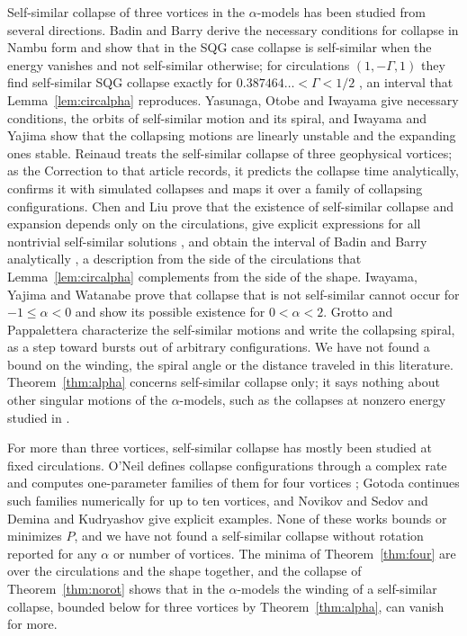 \documentclass[11pt]{article}
\theoremstyle{definition}
\begin{document}
Self-similar collapse of three vortices in the $\alpha$-models has been studied from several directions. Badin and Barry \cite{bb2018} derive the necessary conditions for collapse in Nambu form and show that in the SQG case collapse is self-similar when the energy vanishes and not self-similar otherwise; for circulations $(1, -\Gamma, 1)$ they find self-similar SQG collapse exactly for $0.387464\ldots < \Gamma < 1/2$ \cite[Lemma~1]{bb2018}, an interval that Lemma~\ref{lem:circalpha} reproduces. Yasunaga, Otobe and Iwayama \cite{yoi2021} give necessary conditions, the orbits of self-similar motion and its spiral, and Iwayama and Yajima \cite{iy2023} show that the collapsing motions are linearly unstable and the expanding ones stable. Reinaud \cite{reinaud2021} treats the self-similar collapse of three geophysical vortices; as the Correction to that article records, it predicts the collapse time analytically, confirms it with simulated collapses and maps it over a family of collapsing configurations. Chen and Liu \cite{cl2024} prove that the existence of self-similar collapse and expansion depends only on the circulations, give explicit expressions for all nontrivial self-similar solutions \cite[Theorems~2.1, 2.2]{cl2024}, and obtain the interval of Badin and Barry analytically \cite[Theorem~4.1]{cl2024}, a description from the side of the circulations that Lemma~\ref{lem:circalpha} complements from the side of the shape. Iwayama, Yajima and Watanabe \cite{iyw2025} prove that collapse that is not self-similar cannot occur for $-1 \le \alpha < 0$ and show its possible existence for $0 < \alpha < 2$. Grotto and Pappalettera \cite[Prop.~2.1]{gp2025} characterize the self-similar motions and write the collapsing spiral, as a step toward bursts out of arbitrary configurations. We have not found a bound on the winding, the spiral angle or the distance traveled in this literature. Theorem~\ref{thm:alpha} concerns self-similar collapse only; it says nothing about other singular motions of the $\alpha$-models, such as the collapses at nonzero energy studied in \cite{bb2018,iyw2025}.

For more than three vortices, self-similar collapse has mostly been studied at fixed circulations. O'Neil \cite{oneil1987} defines collapse configurations through a complex rate \cite[Definition~1.1.3]{oneil1987} and computes one-parameter families of them for four vortices \cite[Sect.~8.5]{oneil1987}; Gotoda \cite{gotoda2021} continues such families numerically for up to ten vortices, and Novikov and Sedov \cite{ns1979} and Demina and Kudryashov \cite{dk2014} give explicit examples. None of these works bounds or minimizes $P$, and we have not found a self-similar collapse without rotation reported for any $\alpha$ or number of vortices. The minima of Theorem~\ref{thm:four} are over the circulations and the shape together, and the collapse of Theorem~\ref{thm:norot} shows that in the $\alpha$-models the winding of a self-similar collapse, bounded below for three vortices by Theorem~\ref{thm:alpha}, can vanish for more.
\end{document}
